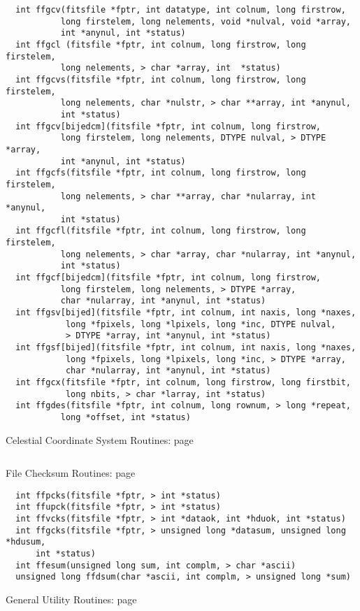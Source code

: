 \begin{verbatim}
  int ffgcv(fitsfile *fptr, int datatype, int colnum, long firstrow,
           long firstelem, long nelements, void *nulval, void *array,
           int *anynul, int *status)
  int ffgcl (fitsfile *fptr, int colnum, long firstrow, long firstelem,
           long nelements, > char *array, int  *status)
  int ffgcvs(fitsfile *fptr, int colnum, long firstrow, long firstelem,
           long nelements, char *nulstr, > char **array, int *anynul,
           int *status)
  int ffgcv[bijedcm](fitsfile *fptr, int colnum, long firstrow,
           long firstelem, long nelements, DTYPE nulval, > DTYPE *array,
           int *anynul, int *status)
  int ffgcfs(fitsfile *fptr, int colnum, long firstrow, long firstelem,
           long nelements, > char **array, char *nularray, int *anynul,
           int *status)
  int ffgcfl(fitsfile *fptr, int colnum, long firstrow, long firstelem,
           long nelements, > char *array, char *nularray, int *anynul,
           int *status)
  int ffgcf[bijedcm](fitsfile *fptr, int colnum, long firstrow,
           long firstelem, long nelements, > DTYPE *array,
           char *nularray, int *anynul, int *status)
  int ffgsv[bijed](fitsfile *fptr, int colnum, int naxis, long *naxes,
            long *fpixels, long *lpixels, long *inc, DTYPE nulval,
            > DTYPE *array, int *anynul, int *status)
  int ffgsf[bijed](fitsfile *fptr, int colnum, int naxis, long *naxes,
            long *fpixels, long *lpixels, long *inc, > DTYPE *array,
            char *nularray, int *anynul, int *status)
  int ffgcx(fitsfile *fptr, int colnum, long firstrow, long firstbit,
            long nbits, > char *larray, int *status)
  int ffgdes(fitsfile *fptr, int colnum, long rownum, > long *repeat,
           long *offset, int *status)
\end{verbatim}
 Celestial Coordinate System Routines: page~\pageref{FFGICS}

\begin{verbatim}

\end{verbatim}
 File Checksum Routines: page~\pageref{FFPCKS}

\begin{verbatim}
  int ffpcks(fitsfile *fptr, > int *status)
  int ffupck(fitsfile *fptr, > int *status)
  int ffvcks(fitsfile *fptr, > int *dataok, int *hduok, int *status)
  int ffgcks(fitsfile *fptr, > unsigned long *datasum, unsigned long *hdusum,
      int *status)
  int ffesum(unsigned long sum, int complm, > char *ascii)
  unsigned long ffdsum(char *ascii, int complm, > unsigned long *sum)
\end{verbatim}
 General Utility Routines: page~\pageref{FFVERS}

